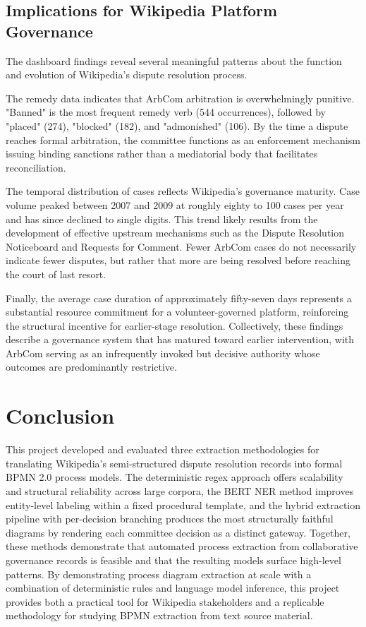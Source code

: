 \documentclass[conference]{IEEEtran}
\begin{document}
\subsection{Implications for Wikipedia Platform Governance}
The dashboard findings reveal several meaningful patterns about the function and evolution of Wikipedia's dispute resolution process.

The remedy data indicates that ArbCom arbitration is overwhelmingly punitive. "Banned" is the most frequent remedy verb (544 occurrences), followed by "placed" (274), "blocked" (182), and "admonished" (106). By the time a dispute reaches formal arbitration, the committee functions as an enforcement mechanism issuing binding sanctions rather than a mediatorial body that facilitates reconciliation.

The temporal distribution of cases reflects Wikipedia's governance maturity. Case volume peaked between 2007 and 2009 at roughly eighty to 100 cases per year and has since declined to single digits. This trend likely results from the development of effective upstream mechanisms such as the Dispute Resolution Noticeboard and Requests for Comment. Fewer ArbCom cases do not necessarily indicate fewer disputes, but rather that more are being resolved before reaching the court of last resort.

Finally, the average case duration of approximately fifty-seven days represents a substantial resource commitment for a volunteer-governed platform, reinforcing the structural incentive for earlier-stage resolution. Collectively, these findings describe a governance system that has matured toward earlier intervention, with ArbCom serving as an infrequently invoked but decisive authority whose outcomes are predominantly restrictive.






\section{Conclusion}
This project developed and evaluated three extraction methodologies for translating Wikipedia's semi-structured dispute resolution records into formal BPMN 2.0 process models. The deterministic regex approach offers scalability and structural reliability across large corpora, the BERT NER method improves entity-level labeling within a fixed procedural template, and the hybrid extraction pipeline with per-decision branching produces the most structurally faithful diagrams by rendering each committee decision as a distinct gateway. Together, these methods demonstrate that automated process extraction from collaborative governance records is feasible and that the resulting models surface high-level patterns. By demonstrating process diagram extraction at scale with a combination of deterministic rules and language model inference, this project provides both a practical tool for Wikipedia stakeholders and a replicable methodology for studying BPMN extraction from text source material.
\end{document}
